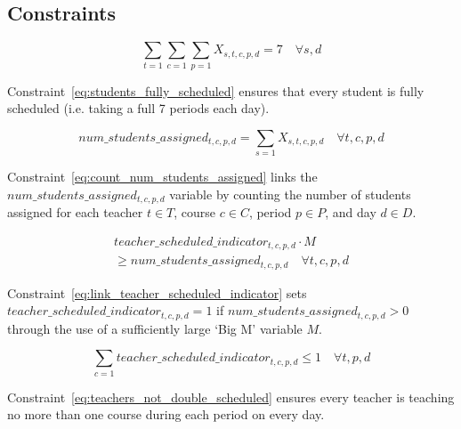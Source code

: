 \documentclass[12pt]{article}
\begin{document}
\subsection{Constraints}

\begin{equation} \label{eq:students_fully_scheduled}
	\displaystyle\sum_{t=1}\sum_{c=1}\sum_{p=1} X_{s,t,c,p,d}=7 \quad \forall s,d
\end{equation}

Constraint~\ref{eq:students_fully_scheduled} ensures that every student is fully scheduled (i.e. taking a full 7 periods each day).

\begin{equation} \label{eq:count_num_students_assigned}
	num\_students\_assigned_{t,c,p,d} = \displaystyle\sum_{s=1} X_{s,t,c,p,d}  \quad \forall t,c,p,d
\end{equation}

Constraint~\ref{eq:count_num_students_assigned} links the $num\_students\_assigned_{t,c,p,d}$ variable by counting the number of students assigned for each teacher $t \in T$, course $c \in C$, period $p \in P$, and day $d \in D$.

\begin{multline}\label{eq:link_teacher_scheduled_indicator}
	teacher\_scheduled\_indicator_{t,c,p,d} \cdot M \\ \geq num\_students\_assigned_{t,c,p,d}  \quad \forall t,c,p,d
\end{multline}

Constraint~\ref{eq:link_teacher_scheduled_indicator} sets $teacher\_scheduled\_indicator_{t,c,p,d}=1$ if $num\_students\_assigned_{t,c,p,d}>0$ through the use of a sufficiently large `Big M' variable $M$.

\begin{equation} \label{eq:teachers_not_double_scheduled}
	\displaystyle\sum_{c=1} teacher\_scheduled\_indicator_{t,c,p,d} \leq 1 \quad \forall t,p,d
\end{equation}

Constraint~\ref{eq:teachers_not_double_scheduled} ensures every teacher is teaching no more than one course during each period on every day.
\end{document}
